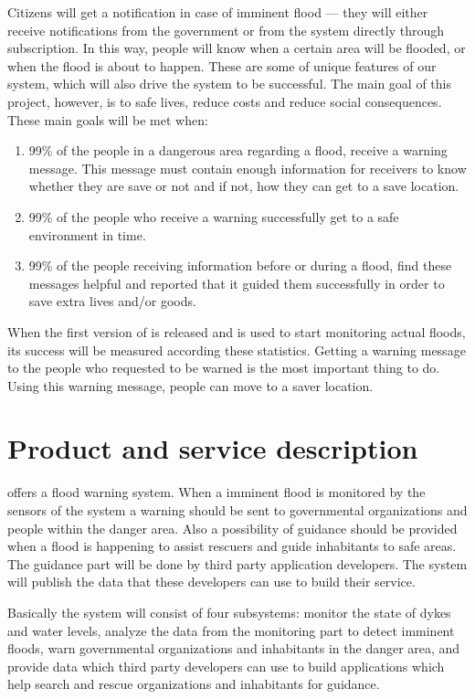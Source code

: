 Citizens will get a notification in case of imminent flood --- they will either receive notifications from the government or from the system directly through subscription. In this way, people will know when a certain area will be flooded, or when the flood is about to happen. These are some of unique features of our system, which will also drive the system to be successful. The main goal of this project, however, is to safe lives, reduce costs and reduce social consequences. These main goals will be met when:
\begin{enumerate}
	\item 99\% of the people in a dangerous area regarding a flood, receive a warning message. This message must contain enough information for receivers to know whether they are save or not and if not, how they can get to a save location.
	\item 99\% of the people who receive a warning successfully get to a safe environment in time.
	\item 99\% of the people receiving information before or during a flood, find these messages helpful and reported that it guided them successfully in order to save extra lives and/or goods.
\end{enumerate}

When the first version of \ProjectName{} is released and is used to start monitoring actual floods, its success will be measured according these statistics. Getting a warning message to the people who requested to be warned is the most important thing to do. Using this warning message, people can move to a saver location.

\section{Product and service description}
\CompanyName{} offers a flood warning system. When a imminent flood is monitored by the sensors of the system a warning should be sent to governmental organizations and people within the danger area. Also a possibility of guidance should be provided when a flood is happening to assist rescuers and guide inhabitants to safe areas. The guidance part will be done by third party application developers. The system will publish the data that these developers can use to build their service.

Basically the system will consist of four subsystems: monitor the state of dykes and water levels, analyze the data from the monitoring part to detect imminent floods, warn governmental organizations and inhabitants in the danger area, and provide data which third party developers can use to build applications which help search and rescue organizations and inhabitants for guidance.

